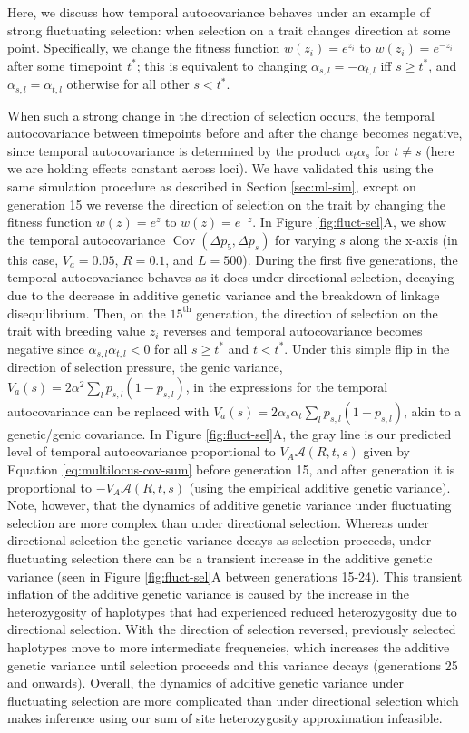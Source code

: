 \documentclass[11pt]{article}
\DeclareMathOperator{\cov}{Cov}
\begin{document}
Here, we discuss how temporal autocovariance behaves under an example of strong
fluctuating selection: when selection on a trait changes direction at some
point. Specifically, we change the fitness function $w(z_i) = e^{z_i}$ to
$w(z_i) = e^{-z_i}$ after some timepoint $t^*$; this is equivalent to changing
$\alpha_{s,l} = - \alpha_{t,l}$ iff $s \ge t^*$, and $\alpha_{s,l} =
\alpha_{t,l}$ otherwise for all other $s < t^*$.

When such a strong change in the direction of selection occurs, the temporal
autocovariance between timepoints before and after the change becomes negative,
since temporal autocovariance is determined by the product $\alpha_{t}
\alpha_{s}$ for $t \ne s$ (here we are holding effects constant across loci).
We have validated this using the same simulation procedure as described in
Section \ref{sec:ml-sim}, except on generation 15 we reverse the direction of
selection on the trait by changing the fitness function $w(z) = e^z$ to $w(z) =
e^{-z}$. In Figure \ref{fig:fluct-sel}A, we show the temporal autocovariance
$\cov(\Delta p_5, \Delta p_s)$ for varying $s$ along the x-axis (in this case,
$V_a=0.05$, $R=0.1$, and $L=500$). During the first five generations, the
temporal autocovariance behaves as it does under directional selection,
decaying due to the decrease in additive genetic variance and the breakdown of
linkage disequilibrium. Then, on the $15^\text{th}$ generation, the direction
of selection on the trait with breeding value $z_i$ reverses and temporal
autocovariance becomes negative since $\alpha_{s,l} \alpha_{t,l} < 0$ for all
$s \ge t^*$ and $t < t^*$. Under this simple flip in the direction of selection
pressure, the genic variance, $V_a(s) = 2 \alpha^2 \sum_l p_{s,l}(1-p_{s,l})$,
in the expressions for the temporal autocovariance can be replaced with $V_a(s)
= 2 \alpha_s \alpha_t \sum_l p_{s,l}(1-p_{s,l})$, akin to a genetic/genic
covariance.  In Figure \ref{fig:fluct-sel}A, the gray line is our predicted
level of temporal autocovariance proportional to $V_A \mathcal{A}(R,t, s)$
given by Equation \eqref{eq:multilocus-cov-sum} before generation 15, and after
generation it is proportional to $-V_A \mathcal{A}(R,t, s)$ (using the
empirical additive genetic variance).  Note, however, that the dynamics of
additive genetic variance under fluctuating selection are more complex than
under directional selection.  Whereas under directional selection the genetic
variance decays as selection proceeds, under fluctuating selection there can be
a transient increase in the additive genetic variance (seen in Figure
\ref{fig:fluct-sel}A between generations 15-24).  This transient inflation
of the additive genetic variance is caused by the increase in the
heterozygosity of haplotypes that had experienced reduced heterozygosity due to
directional selection. With the direction of selection reversed, previously
selected haplotypes move to more intermediate frequencies, which increases the
additive genetic variance until selection proceeds and this variance decays
(generations 25 and onwards).  Overall, the dynamics of additive genetic
variance under fluctuating selection are more complicated than under
directional selection which makes inference using our sum of site
heterozygosity approximation infeasible.
\end{document}
